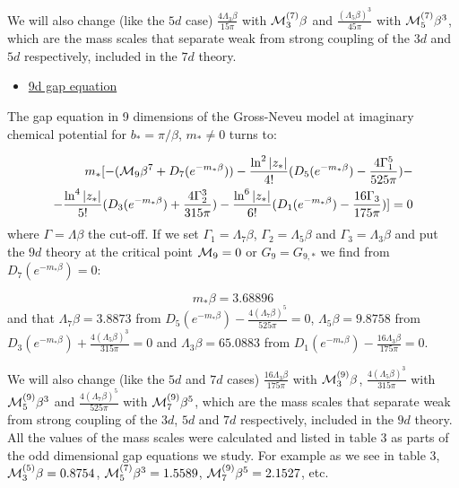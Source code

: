 \documentclass[twoside]{article}
\begin{document}
We will also change (like the $5d$ case) $\frac{4\Lambda_3\beta}{15\pi}$ with ${\cal M}_3^{(7)}\beta$ and $\frac{(\Lambda_5\beta)^3}{45\pi}$ with ${\cal M}_5^{(7)}\beta^3$, which are the mass scales that separate weak from strong coupling of the $3d$ and $5d$ respectively, included in the $7d$ theory. 
 
 \begin{itemize}
 	\item \underline{9d gap equation}
 \end{itemize}
 
The gap equation in 9 dimensions of the Gross-Neveu model at imaginary chemical potential for $b_*=\pi/\beta$, $m_*\not=0$ turns to:

\begin{align}
m_*[-({\cal M}_9\beta^7+D_7(e^{-m_*\beta}))-\frac{\ln^2|z_*|}{4!}(D_5(e^{-m_*\beta})-\frac{4\Gamma_1^5}{525\pi})-\\\nonumber
-\frac{\ln^4|z_*|}{5!}(D_3(e^{-m_*\beta})
+\frac{4\Gamma_2^3}{315\pi})
-\frac{\ln^6|z_*|}{6!}(D_1(e^{-m_*\beta})-\frac{16\Gamma_3}{175\pi})]=0
\end{align}
where $\Gamma=\Lambda\beta$ the cut-off. If we set $\Gamma_1=\Lambda_7\beta$, $\Gamma_2=\Lambda_5\beta$ and $\Gamma_3=\Lambda_3\beta$ and put the $9d$ theory at the critical point ${\cal M}_9=0$ or $G_9=G_{9,*}$ we find from $D_7(e^{-m_*\beta})=0$:

\begin{equation}
\boxed
{m_*\beta=3.68896}
\end{equation}
and that $\Lambda_7\beta=3.8873$ from $D_5(e^{-m_*\beta})-\frac{4(\Lambda_7\beta)^5}{525\pi}=0$, $\Lambda_5\beta=9.8758$ from $D_3(e^{-m_*\beta})+\frac{4(\Lambda_5\beta)^3}{315\pi}=0$ and $\Lambda_3\beta=65.0883$ from $D_1(e^{-m_*\beta})-\frac{16\Lambda_3\beta}{175\pi}=0$.

We will also change (like the $5d$ and $7d$ cases) $\frac{16\Lambda_3\beta}{175\pi}$ with ${\cal M}_3^{(9)}\beta$, $\frac{4(\Lambda_5\beta)^3}{315\pi}$ with ${\cal M}_5^{(9)}\beta^3$ and $\frac{4(\Lambda_7\beta)^5}{525\pi}$ with ${\cal M}_7^{(9)}\beta^5$, which are the mass scales that separate weak from strong coupling of the $3d$, $5d$ and $7d$ respectively, included in the $9d$ theory. All the values of the mass scales were calculated and listed in table 3 as parts of the odd dimensional gap equations we study. For example as we see in table 3, ${\cal M}_3^{(5)}\beta=0.8754$, ${\cal M}_5^{(7)}\beta^3=1.5589$, ${\cal M}_7^{(9)}\beta^5=2.1527$, etc.
 
\end{document}
